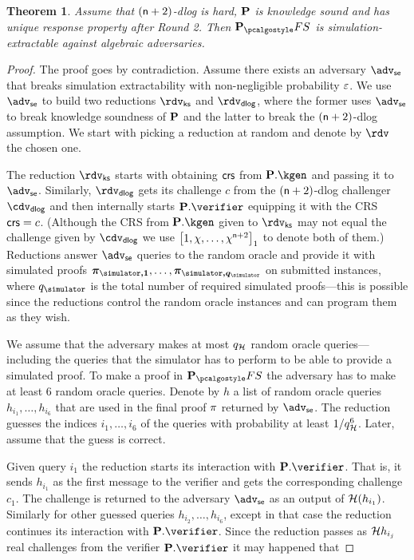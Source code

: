 \documentclass[runningheads,11pt]{llncs}
\let\spvec\vec
\let\vec\accentvec
\let\vec\spvec
\def\vec#1{\mathchoice{\mbox{\boldmath$\displaystyle#1$}}
	{\mbox{\boldmath$\textstyle#1$}}
	{\mbox{\boldmath$\scriptstyle#1$}}
	{\mbox{\boldmath$\scriptscriptstyle#1$}}}
\newtheorem{theorem}{Theorem}%
\theoremstyle{definition}
\begin{document}
\begin{theorem}
	Assume that $(\mathsf{n} + 2)$-dlog is hard, $\mathbf{P}$ is knowledge sound and has unique response property after Round 2. 
	Then $\plonkprotfs$ is simulation-extractable against algebraic adversaries.
\end{theorem}
\begin{proof}
	The proof goes by contradiction. Assume there exists an adversary $\advse$ that breaks simulation extractability with non-negligible probability $\varepsilon$. 
	We use $\advse$ to build two reductions $\rdvks$ and $\rdvdlog$, where the former uses $\advse$ to break knowledge soundness of $\mathbf{P}$ and the latter to break the $(\mathsf{n} + 2)$-dlog assumption.
	We start with picking a reduction at random and denote by $\rdv$ the chosen one.
	
	The reduction $\rdvks$ starts with obtaining $\mathsf{crs}$ from $\plonkprot.\kgen$ and passing it to $\advse$. 
	Similarly, $\rdvdlog$ gets its challenge $c$ from the $(\mathsf{n} + 2)$-dlog challenger $\cdv_\dlog$ and then internally starts $\plonkprot.\verifier$ equipping it with the CRS $\mathsf{crs} = c$. (Although the CRS from $\plonkprot.\kgen$ given to $\rdvks$ may not equal the challenge given by $\cdv_\dlog$ we use $\left[1, \chi, \ldots, \chi^{\mathsf{n} + 2}\right]_{1}$ to denote both of them.)
	Reductions answer $\advse$ queries to the random oracle and provide it with simulated proofs $\vec{\zkproof_{\simulator, 1}}, \ldots, \vec{\zkproof_{\simulator, q_\simulator}}$ on submitted instances, where $q_\simulator$ is the total number of required simulated proofs---this is possible since the reductions control the random oracle instances and can program them as they wish.
	
	We assume that the adversary makes at most $q_{\mathcal{H}}$ random oracle
  queries---including the queries that the simulator has to perform to be able
  to provide a simulated proof. 
	To make a proof in $\plonkprotfs$ the adversary has to make at least $6$ random oracle queries. 
	Denote by $h$ a list of random oracle queries $h_{i_1}, \ldots, h_{i_6}$ that are used in the final proof $\pi$ returned by $\advse$.
	The reduction guesses the indices $i_1, \ldots, i_6$ of the queries with probability at least $1 / q_{\mathcal{H}}^6$. Later, assume that the guess is correct.
	
	Given query $i_1$ the reduction starts its interaction with $\plonkprot.\verifier$. That is, it sends $h_{i_1}$ as the first message to the verifier and gets the corresponding challenge $c_1$. The challenge is returned to the adversary $\advse$ as an output of $\mathcal{H}(h_{i_1})$. 
	Similarly for other guessed queries $h_{i_2}, \ldots, h_{i_6}$, except in that
  case the reduction continues its interaction with $\plonkprot.\verifier$.
	Since the reduction passes as $\mathcal{H}{h_{i_j}}$ real challenges from the verifier $\plonkprot.\verifier$ it may happened that 
		

\end{proof}
\end{document}

